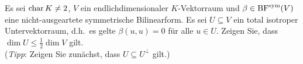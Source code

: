 \documentclass[a4paper, 10pt]{scrartcl}
\begin{document}










\begin{question}
  Es sei $\operatorname{char} K \neq 2$, $V$ ein endlichdimensionaler $K$-Vektorraum und $\beta \in \operatorname{BF}^{\operatorname{sym}}(V)$ eine nicht-ausgeartete symmetrische Bilinearform.
  Es sei $U \subseteq V$ ein total isotroper Untervektorraum, d.h.\ es gelte $\beta(u,u) = 0$ für alle $u \in U$.
  Zeigen Sie, dass $\dim U \leq \frac{1}{2} \dim V$ gilt.
  \\
  (\emph{Tipp}:
   Zeigen Sie zunächst, dass $U \subseteq U^\perp$ gilt.)
\end{question}
\end{document}
